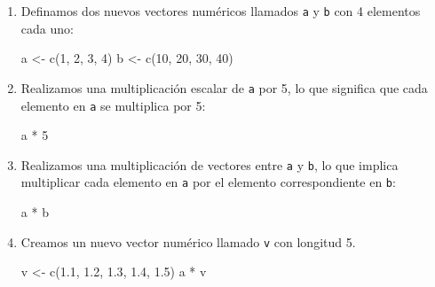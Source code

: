 \documentclass[
  letterpaper,
  DIV=11,
  numbers=noendperiod]{scrartcl}
\newenvironment{Shaded}{}{}
\newcommand{\DecValTok}[1]{\textcolor[rgb]{0.00,0.36,0.77}{#1}}
\newcommand{\FloatTok}[1]{\textcolor[rgb]{0.00,0.36,0.77}{#1}}
\newcommand{\FunctionTok}[1]{\textcolor[rgb]{0.44,0.26,0.76}{#1}}
\newcommand{\NormalTok}[1]{\textcolor[rgb]{0.14,0.16,0.18}{#1}}
\newcommand{\OtherTok}[1]{\textcolor[rgb]{0.44,0.26,0.76}{#1}}
\newcommand{\SpecialCharTok}[1]{\textcolor[rgb]{0.00,0.36,0.77}{#1}}
\begin{document}
\begin{enumerate}
\def\labelenumi{\arabic{enumi}.}
\item
  Definamos dos nuevos vectores numéricos llamados \texttt{a} y
  \texttt{b} con 4 elementos cada uno:

\begin{Shaded}
\begin{Highlighting}[]
\NormalTok{a }\OtherTok{\textless{}{-}} \FunctionTok{c}\NormalTok{(}\DecValTok{1}\NormalTok{, }\DecValTok{2}\NormalTok{, }\DecValTok{3}\NormalTok{, }\DecValTok{4}\NormalTok{)}
\NormalTok{b }\OtherTok{\textless{}{-}} \FunctionTok{c}\NormalTok{(}\DecValTok{10}\NormalTok{, }\DecValTok{20}\NormalTok{, }\DecValTok{30}\NormalTok{, }\DecValTok{40}\NormalTok{)}
\end{Highlighting}
\end{Shaded}
\item
  Realizamos una multiplicación escalar de \texttt{a} por 5, lo que
  significa que cada elemento en \texttt{a} se multiplica por 5:

\begin{Shaded}
\begin{Highlighting}[]
\NormalTok{a }\SpecialCharTok{*} \DecValTok{5}
\end{Highlighting}
\end{Shaded}
\item
  Realizamos una multiplicación de vectores entre \texttt{a} y
  \texttt{b}, lo que implica multiplicar cada elemento en \texttt{a} por
  el elemento correspondiente en \texttt{b}:

\begin{Shaded}
\begin{Highlighting}[]
\NormalTok{a }\SpecialCharTok{*}\NormalTok{ b}
\end{Highlighting}
\end{Shaded}
\item
  Creamos un nuevo vector numérico llamado \texttt{v} con longitud 5.

\begin{Shaded}
\begin{Highlighting}[]
\NormalTok{v }\OtherTok{\textless{}{-}} \FunctionTok{c}\NormalTok{(}\FloatTok{1.1}\NormalTok{, }\FloatTok{1.2}\NormalTok{, }\FloatTok{1.3}\NormalTok{, }\FloatTok{1.4}\NormalTok{, }\FloatTok{1.5}\NormalTok{)}
\NormalTok{a }\SpecialCharTok{*}\NormalTok{ v}
\end{Highlighting}
\end{Shaded}
\end{enumerate}
\end{document}
